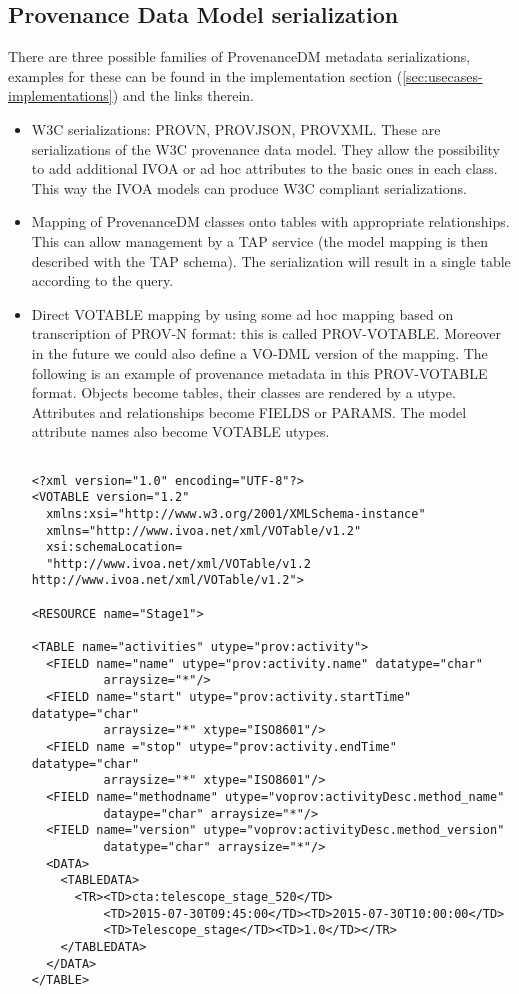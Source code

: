 \subsection{Provenance Data Model serialization}
There are three possible families of ProvenanceDM metadata serializations, examples for these can be found in the implementation section (\ref{sec:usecases-implementations}) and the links therein.
\begin{itemize}
 \item W3C serializations: PROV\-N, PROV\-JSON, PROV\-XML. These are serializations of the W3C provenance data model. They allow the possibility to add additional IVOA or ad hoc attributes to the basic ones in each class. This way the IVOA models can produce W3C compliant serializations.
 \item Mapping of ProvenanceDM classes onto tables with appropriate relationships. This can allow management by a TAP service (the model mapping is then described with the TAP schema). The serialization will result in a single table according to the query.


 \item Direct VOTABLE mapping by using some ad hoc mapping based on transcription of PROV-N format: this is called PROV-VOTABLE. Moreover in the future we could also define a VO-DML \citep{std:VODML} version of the mapping.
The following is an example of provenance metadata in this PROV-VOTABLE format. Objects become tables, their classes are rendered by a utype. Attributes and relationships become FIELDS or PARAMS. The model attribute names also become VOTABLE utypes.  
\begin{verbatim}

<?xml version="1.0" encoding="UTF-8"?>
<VOTABLE version="1.2" 
  xmlns:xsi="http://www.w3.org/2001/XMLSchema-instance"
  xmlns="http://www.ivoa.net/xml/VOTable/v1.2"
  xsi:schemaLocation=
  "http://www.ivoa.net/xml/VOTable/v1.2 http://www.ivoa.net/xml/VOTable/v1.2">

<RESOURCE name="Stage1">

<TABLE name="activities" utype="prov:activity">
  <FIELD name="name" utype="prov:activity.name" datatype="char" 
          arraysize="*"/>
  <FIELD name="start" utype="prov:activity.startTime" datatype="char" 
          arraysize="*" xtype="ISO8601"/>
  <FIELD name ="stop" utype="prov:activity.endTime"  datatype="char" 
          arraysize="*" xtype="ISO8601"/>
  <FIELD name="methodname" utype="voprov:activityDesc.method_name" 
          dataype="char" arraysize="*"/>
  <FIELD name="version" utype="voprov:activityDesc.method_version" 
          datatype="char" arraysize="*"/>  
  <DATA>
    <TABLEDATA>
      <TR><TD>cta:telescope_stage_520</TD>
          <TD>2015-07-30T09:45:00</TD><TD>2015-07-30T10:00:00</TD>
          <TD>Telescope_stage</TD><TD>1.0</TD></TR>
    </TABLEDATA>
  </DATA>      
</TABLE>


\end{verbatim}
\end{itemize}
